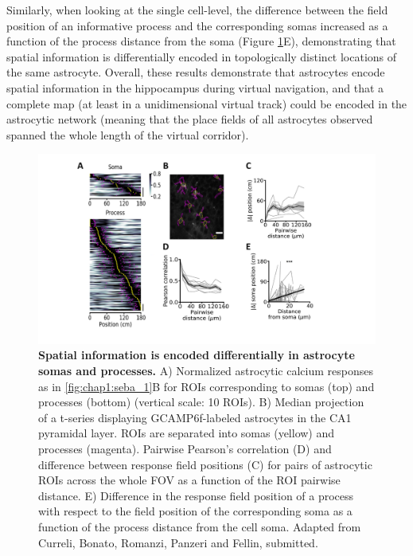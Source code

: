 Similarly, when looking at the single cell-level, the difference between the field position of an informative process and the corresponding somas increased as a function of the process distance from the soma (Figure \ref{fig:chap1:seba_2}E), demonstrating that spatial information is differentially encoded in topologically distinct locations of the same astrocyte. 
Overall, these results demonstrate that astrocytes encode spatial information in the hippocampus during virtual navigation, and that a complete map (at least in a unidimensional virtual track) could be encoded in the astrocytic network (meaning that the place fields of all astrocytes observed spanned the whole length of the virtual corridor).
\begin{figure}[h]
    \centering
    \includegraphics[trim={110 40 130 0},clip,width=\textwidth]{Figures/Chapter1/intro_fig_seba_2.pdf}
    \caption[Spatial information is encoded differentially in astrocyte somas and processes]{\textbf{Spatial information is encoded differentially in astrocyte somas and processes.} 
    A) Normalized astrocytic calcium responses as in \ref{fig:chap1:seba_1}B for ROIs corresponding to somas (top) and processes (bottom) (vertical scale: 10 ROIs). 
    B) Median projection of a t-series displaying GCAMP6f-labeled astrocytes in the CA1 pyramidal layer. ROIs are separated into somas (yellow) and processes (magenta). 
    Pairwise Pearson’s correlation (D) and difference between response field positions (C) for pairs of astrocytic ROIs across the whole FOV as a function of the ROI pairwise distance. 
    E) Difference in the response field position of a process with respect to the field position of the corresponding soma as a function of the process distance from the cell soma.
    Adapted from Curreli, Bonato, Romanzi, Panzeri and Fellin, submitted.}
    \label{fig:chap1:seba_2}
\end{figure}

